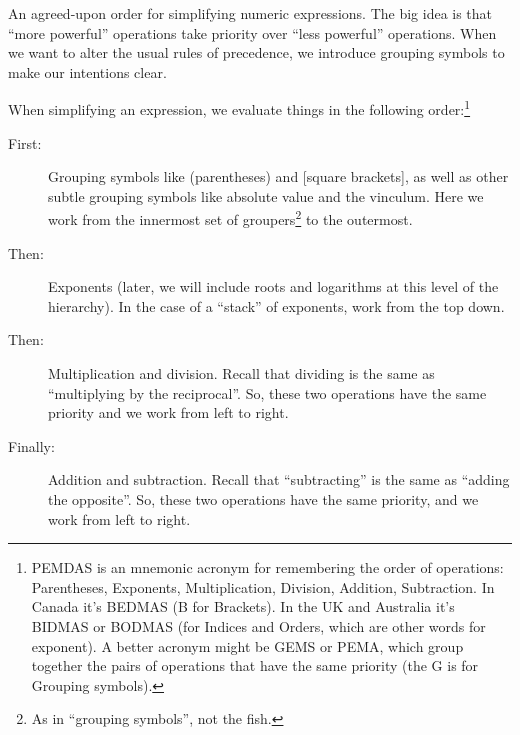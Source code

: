 \begin{boxdef}
An agreed-upon order for simplifying numeric expressions. The big idea is that ``more powerful'' operations take priority over ``less powerful'' operations. When we want to alter the usual rules of precedence, we introduce grouping symbols to make our intentions clear.

When simplifying an expression, we evaluate things in the following order:\footnote{PEMDAS is an mnemonic acronym for remembering the order of operations: Parentheses, Exponents, Multiplication, Division, Addition, Subtraction. In Canada it's BEDMAS (B for Brackets). In the UK and Australia it's BIDMAS or BODMAS (for Indices and Orders, which are other words for exponent). A better acronym might be GEMS or PEMA, which group together the pairs of operations that have the same priority (the G is for Grouping symbols).}

\begin{description}
\item[First:] Grouping symbols like (parentheses) and [square brackets], as well as other subtle grouping symbols like absolute value and the vinculum. Here we work from the innermost set of groupers\footnote{As in ``grouping symbols'', not the fish.} to the outermost.

\item[Then:] Exponents (later, we will include roots and logarithms at this level of the hierarchy). In the case of a ``stack'' of exponents, work from the top down.

\item[Then:] Multiplication and division. Recall that dividing is the same as ``multiplying by the reciprocal''. So, these two operations have the same priority and we work from left to right.

\item[Finally:] Addition and subtraction. Recall that ``subtracting'' is the same as ``adding the opposite''. So, these two operations have the same priority, and we work from left to right.
\end{description}
\end{boxdef}

